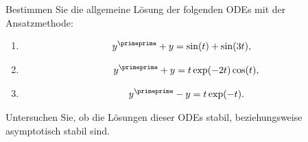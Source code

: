\begin{exercise}
Bestimmen Sie die allgemeine Lösung der folgenden ODEs mit der
Ansatzmethode:
\begin{enumerate}[label = \textbf{\alph*)}]
\item \begin{align*}
  y^{\primeprime} + y &= \sin(t) + \sin(3t),
\end{align*}
\item \begin{align*}
  y^{\primeprime} + y = t\exp(-2t)\cos(t),
\end{align*}
\item \begin{align*}
  y^{\primeprime} - y = t\exp(-t).
\end{align*}
\end{enumerate}
Untersuchen Sie, ob die Lösungen dieser ODEs stabil, beziehungsweise
asymptotisch stabil sind.
\end{exercise}
